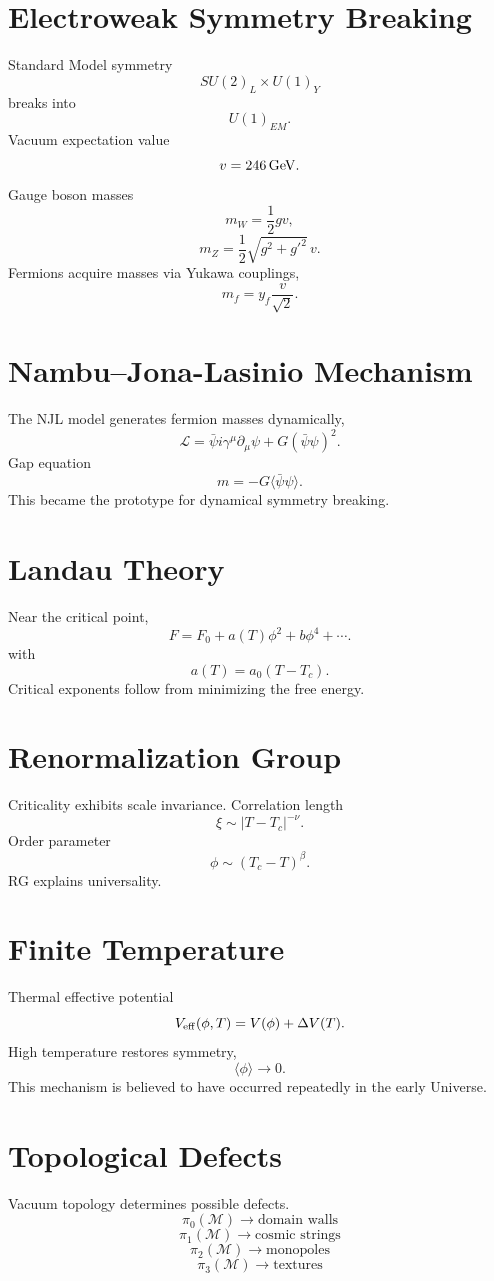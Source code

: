 \documentclass[11pt,a4paper]{article}
\begin{document}
\section{Electroweak Symmetry Breaking}
Standard Model symmetry
\[
SU(2)_L
\times
U(1)_Y
\]
breaks into
\[
U(1)_{EM}.
\]
Vacuum expectation value
\[
v
=
246\,
{\rm GeV}.
\]
Gauge boson masses
\[
m_W
=
\frac12gv,
\]
\[
m_Z
=
\frac12
\sqrt{g^2+g'^2}
\,v.
\]
Fermions acquire masses via Yukawa couplings,
\[
m_f
=
y_f
\frac{v}{\sqrt2}.
\]
\section{Nambu--Jona-Lasinio Mechanism}
The NJL model generates fermion masses dynamically,
\[
\mathcal L
=
\bar\psi i\gamma^\mu\partial_\mu\psi
+
G
(\bar\psi\psi)^2.
\]
Gap equation
\[
m
=
-G
\langle\bar\psi\psi\rangle.
\]
This became the prototype for dynamical symmetry breaking.
\section{Landau Theory}
Near the critical point,
\[
F
=
F_0
+
a(T)\phi^2
+
b\phi^4+\cdots.
\]
with
\[
a(T)
=
a_0(T-T_c).
\]
Critical exponents follow from minimizing the free energy.
\section{Renormalization Group}
Criticality exhibits scale invariance.
Correlation length
\[
\xi
\sim
|T-T_c|^{-\nu}.
\]
Order parameter
\[
\phi
\sim
(T_c-T)^\beta.
\]
RG explains universality.
\section{Finite Temperature}
Thermal effective potential
\[
V_{\rm eff}(\phi,T)
=
V(\phi)
+
\Delta V(T).
\]
High temperature restores symmetry,
\[
\langle\phi\rangle
\rightarrow0.
\]
This mechanism is believed to have occurred repeatedly in the early Universe.
\section{Topological Defects}
Vacuum topology determines possible defects.
\[
\pi_0(\mathcal M)
\rightarrow
\text{domain walls}
\]
\[
\pi_1(\mathcal M)
\rightarrow
\text{cosmic strings}
\]
\[
\pi_2(\mathcal M)
\rightarrow
\text{monopoles}
\]
\[
\pi_3(\mathcal M)
\rightarrow
\text{textures}
\]
\end{document}
